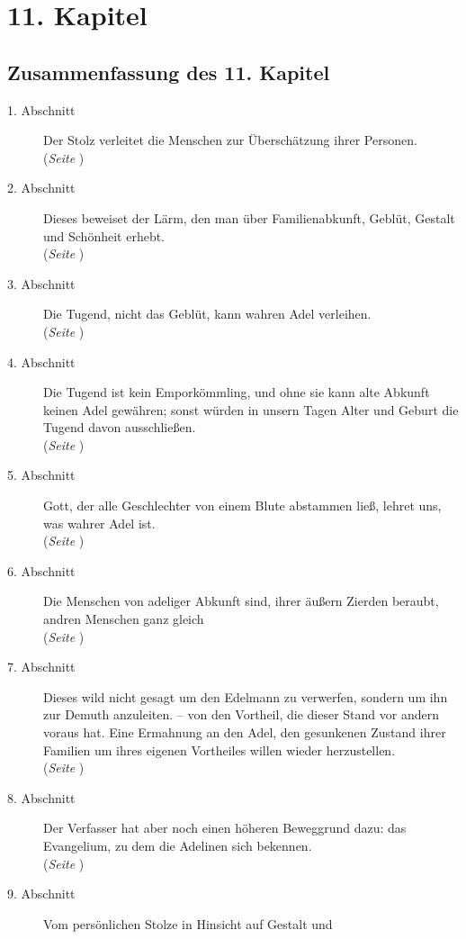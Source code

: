 
\chapter{11. Kapitel} \label{kap11}
\section{Zusammenfassung des 11. Kapitel}
\footnotesize
\begin{description}
\item[1. Abschnitt] Der Stolz verleitet die Menschen zur Überschätzung ihrer
Personen.
\\(\textit{Seite \pageref{kap11_ab1}})
\item[2. Abschnitt] Dieses beweiset der Lärm, den man über Familienabkunft,
Geblüt, Gestalt und Schönheit erhebt.
\\(\textit{Seite \pageref{kap11_ab2}})
\item[3. Abschnitt] Die Tugend, nicht das Geblüt, kann wahren Adel verleihen.
\\(\textit{Seite \pageref{kap11_ab3}})
\item[4. Abschnitt] Die Tugend ist kein Emporkömmling, und ohne sie kann alte
Abkunft keinen Adel gewähren; sonst würden in unsern Tagen Alter und Geburt die
Tugend davon ausschließen.
\\(\textit{Seite \pageref{kap11_ab4}})
\item[5. Abschnitt] Gott, der alle Geschlechter von einem Blute abstammen ließ,
lehret uns, was wahrer Adel ist.
\\(\textit{Seite \pageref{kap11_ab5}})
\item[6. Abschnitt] Die Menschen von adeliger Abkunft sind, ihrer äußern Zierden
beraubt, andren Menschen ganz gleich
\\(\textit{Seite \pageref{kap11_ab6}})
\item[7. Abschnitt] Dieses wild nicht gesagt um den Edelmann zu verwerfen,
sondern um ihn zur Demuth anzuleiten. -- von den Vortheil, die dieser Stand vor
andern voraus hat. Eine Ermahnung an den Adel, den gesunkenen Zustand ihrer
Familien um ihres eigenen Vortheiles willen wieder herzustellen.
\\(\textit{Seite \pageref{kap11_ab7}})
\item[8. Abschnitt] Der Verfasser hat aber noch einen höheren Beweggrund dazu:
das Evangelium, zu dem die Adelinen sich bekennen.
\\(\textit{Seite \pageref{kap11_ab8}})
\item[9. Abschnitt] Vom persönlichen Stolze in Hinsicht auf Gestalt und

\end{description}
